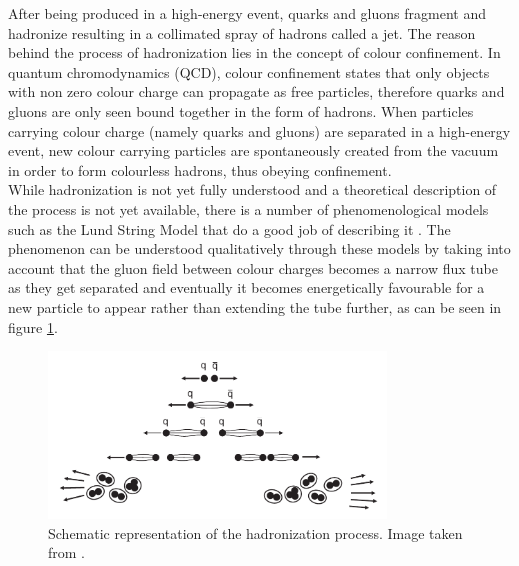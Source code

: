 \documentclass[main]{subfiles} %
\begin{document}


\doublespacing


\vspace{20pt}

After being produced in a high-energy event, quarks and gluons fragment and hadronize resulting in a collimated spray of hadrons called a jet. The reason behind the process of hadronization lies in the concept of colour confinement. In quantum chromodynamics (QCD), colour confinement states that only objects with non zero colour charge can propagate as free particles, therefore quarks and gluons are only seen bound together in the form of hadrons. When particles carrying colour charge (namely quarks and gluons) are separated in a high-energy event, new colour carrying particles are spontaneously created from the vacuum in order to form colourless hadrons, thus obeying confinement. \\

While hadronization is not yet fully understood and a theoretical description of the process is not yet available, there is a number of phenomenological models such as the Lund String Model that do a good job of describing it \cite{Andersson1983}. The phenomenon can be understood qualitatively through these models by taking into account that the gluon field between colour charges becomes a narrow flux tube as they get separated and eventually it becomes energetically favourable for a new particle to appear rather than extending the tube further, as can be seen in figure \ref{fig:hadronization}.\\

\begin{figure}[h]
    \centering
    \includegraphics[width=0.8\textwidth]{../Figures/Theory/hadronization.png}
    \caption{Schematic representation of the hadronization process. Image taken from \cite{Thomson2013}.}
    \label{fig:hadronization}
\end{figure}
\end{document}
